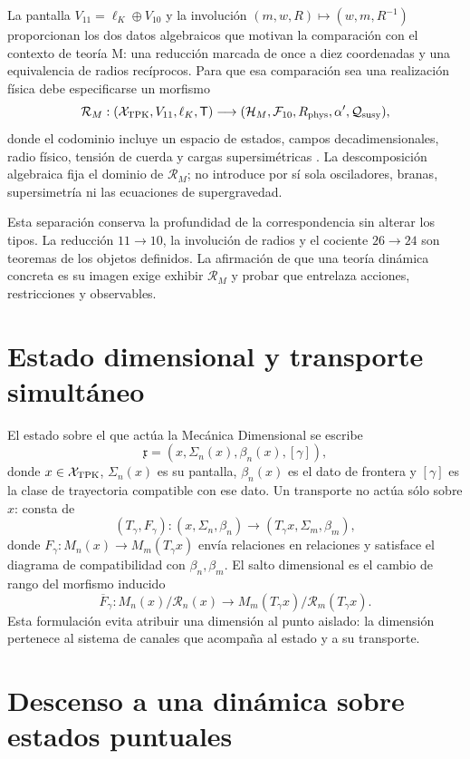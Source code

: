 La pantalla \(V_{11}=\ell_K\oplus V_{10}\) y la involución
\((m,w,R)\mapsto(w,m,R^{-1})\) proporcionan los dos datos algebraicos que
motivan la comparación con el contexto de teoría M: una reducción marcada
de once a diez coordenadas y una equivalencia de radios recíprocos. Para que
esa comparación sea una realización física debe especificarse un morfismo
\[
 \mathcal R_M:
 (\mathcal X_{\rm TPK},V_{11},\ell_K,\mathsf T)
 \longrightarrow
 (\mathcal H_M,\mathcal F_{10},R_{\rm phys},\alpha',
 \mathcal Q_{\rm susy}),
\]
donde el codominio incluye un espacio de estados, campos
decadimensionales, radio físico, tensión de cuerda y cargas supersimétricas
\cite{Witten1995}. La descomposición algebraica fija el dominio de
\(\mathcal R_M\); no introduce por sí sola osciladores, branas,
supersimetría ni las ecuaciones de supergravedad.

Esta separación conserva la profundidad de la correspondencia sin alterar
los tipos. La reducción \(11\to10\), la involución de radios y el cociente
\(26\to24\) son teoremas de los objetos definidos. La afirmación de que una
teoría dinámica concreta es su imagen exige exhibir \(\mathcal R_M\) y probar
que entrelaza acciones, restricciones y observables.

\section{Estado dimensional y transporte simultáneo}

El estado sobre el que actúa la Mecánica Dimensional se escribe
\[
 \mathfrak x=(x,\Sigma_n(x),\beta_n(x),[\gamma]),
\]
donde \(x\in\mathcal X_{\rm TPK}\), \(\Sigma_n(x)\) es su pantalla,
\(\beta_n(x)\) es el dato de frontera y \([\gamma]\) es la clase de trayectoria
compatible con ese dato. Un transporte no actúa sólo sobre \(x\): consta de
\[
 (T_\gamma,F_\gamma):
 (x,\Sigma_n,\beta_n)\longrightarrow
 (T_\gamma x,\Sigma_m,\beta_m),
\]
donde \(F_\gamma:M_n(x)\to M_m(T_\gamma x)\) envía relaciones en relaciones
y satisface el diagrama de compatibilidad con \(\beta_n,\beta_m\). El salto
dimensional es el cambio de rango del morfismo inducido
\[
 \overline F_\gamma:
 M_n(x)/\mathcal R_n(x)\longrightarrow
 M_m(T_\gamma x)/\mathcal R_m(T_\gamma x).
\]
Esta formulación evita atribuir una dimensión al punto aislado: la dimensión
pertenece al sistema de canales que acompaña al estado y a su transporte.

\section{Descenso a una dinámica sobre estados puntuales}

